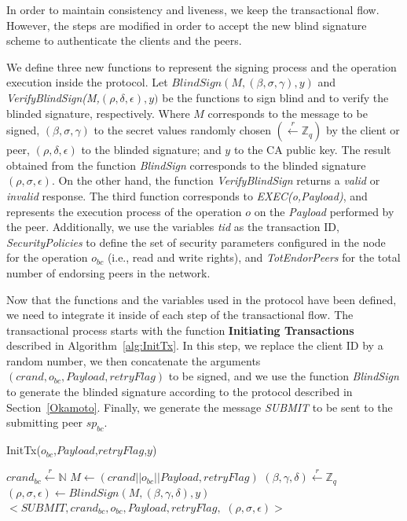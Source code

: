 \documentclass[conference]{llncs}
\begin{document}
In order to maintain consistency and liveness, we keep the transactional flow. However, the steps are modified in order to accept the new blind signature scheme to authenticate the clients and the peers.

We define three new functions to represent the signing process and the operation execution inside the protocol. Let $BlindSign(M,(\beta,\sigma,\gamma),y)$ and \textit{VerifyBlindSign(M,}$(\rho,\delta,\epsilon),y)$ be the functions to sign blind and to verify the blinded signature, respectively. Where $M$ corresponds to the message to be signed, $(\beta,\sigma,\gamma)$ to the secret values randomly chosen $(\xleftarrow[]{r}\mathbb{Z}_q)$ by the client or peer, $(\rho,\delta,\epsilon)$ to the blinded signature; and $y$ to the CA public key. The result obtained from the function \textit{BlindSign} corresponds to the blinded signature $(\rho,\sigma,\epsilon)$. On the other hand, the function \textit{VerifyBlindSign} returns a \textit{valid} or \textit{invalid} response. The third function corresponds to \textit{EXEC(o,Payload)}, and represents the execution process of the operation $o$ on the \textit{Payload} performed by the peer. Additionally, we use the variables \textit{tid} as the transaction ID, \textit{SecurityPolicies} to define the set of security parameters configured in the node for the operation $o_{bc}$ (i.e., read and write rights), and \textit{TotEndorPeers} for the total number of endorsing peers in the network.

Now that the functions and the variables used in the protocol have been defined, we need to integrate it inside of each step of the transactional flow. The transactional process starts with the function \textbf{Initiating Transactions} described in Algorithm~\ref{alg:InitTx}. In this step, we replace the client ID by a random number, we then concatenate the arguments $(crand,o_{bc},Payload,retryFlag)$ to be signed, and we use the function \textit{BlindSign} to generate the blinded signature according to the protocol described in Section~\ref{Okamoto}. Finally, we generate the message \textit{SUBMIT} to be sent to the submitting peer $sp_{bc}$.

\begin{algorithm}[ht]
\caption{InitTx($o_{bc}$,$Payload$,$retryFlag$,$y$)}
\label{alg:InitTx}
\begin{algorithmic}[1]
\STATE $crand_{bc}\xleftarrow[]{r}\mathbb{N}$            
\STATE $M \gets (crand||o_{bc}||Payload,retryFlag)$
\STATE $(\beta,\gamma,\delta)\xleftarrow[]{r}\mathbb{Z}_q$  
\STATE $(\rho,\sigma,\epsilon) \gets BlindSign(M,(\beta,\gamma,\delta),y)$
\RETURN $<\textit{SUBMIT},crand_{bc},o_{bc},Payload,retryFlag,$ $(\rho,\sigma,\epsilon)>$
\end{algorithmic}
\end{algorithm}
\end{document}
